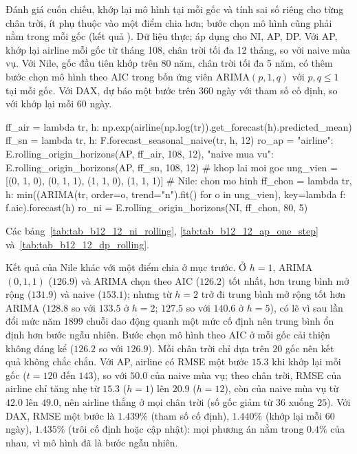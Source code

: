  Đánh giá cuốn chiếu, khớp lại mô hình tại mỗi gốc và tính sai số riêng cho từng chân trời, ít phụ thuộc vào một điểm chia hơn; bước chọn mô hình cũng phải nằm trong mỗi gốc (kết quả ).
 Dữ liệu thực; áp dụng cho NI, AP, DP. Với AP, khớp lại airline mỗi gốc từ tháng 108, chân trời tối đa 12 tháng, so với naive mùa vụ. Với Nile, gốc đầu tiên khớp trên 80 năm, chân trời tối đa 5 năm, có thêm bước chọn mô hình theo AIC trong bốn ứng viên ARIMA$(p,1,q)$ với $p,q\le1$ tại mỗi gốc. Với DAX, dự báo một bước trên $360$ ngày với tham số cố định, so với khớp lại mỗi $60$ ngày.
\begin{codeblock}
ff_air = lambda tr, h: np.exp(airline(np.log(tr)).get_forecast(h).predicted_mean)
ff_sn = lambda tr, h: F.forecast_seasonal_naive(tr, h, 12)
ro_ap = {"airline": E.rolling_origin_horizons(AP, ff_air, 108, 12),
         "naive mua vu": E.rolling_origin_horizons(AP, ff_sn, 108, 12)}      # khop lai moi goc
ung_vien = [(0, 1, 0), (0, 1, 1), (1, 1, 0), (1, 1, 1)]                      # Nile: chon mo hinh
ff_chon = lambda tr, h: min((ARIMA(tr, order=o, trend="n").fit() for o in ung_vien),
                            key=lambda f: f.aic).forecast(h)
ro_ni = E.rolling_origin_horizons(NI, ff_chon, 80, 5)
\end{codeblock}
 Các bảng~\ref{tab:tab_b12_12_ni_rolling}, \ref{tab:tab_b12_12_ap_one_step} và~\ref{tab:tab_b12_12_dp_rolling}.



 Kết quả của Nile khác với một điểm chia ở mục trước. Ở $h=1$, ARIMA$(0,1,1)$ ($126.9$) và ARIMA chọn theo AIC ($126.2$) tốt nhất, hơn trung bình mở rộng ($131.9$) và naive ($153.1$); nhưng từ $h=2$ trở đi trung bình mở rộng tốt hơn ARIMA ($128.8$ so với $133.5$ ở $h=2$; $127.5$ so với $140.6$ ở $h=5$), có lẽ vì sau lần đổi mức năm 1899 chuỗi dao động quanh một mức cố định nên trung bình ổn định hơn bước ngẫu nhiên. Bước chọn mô hình theo AIC ở mỗi gốc cải thiện không đáng kể ($126.2$ so với $126.9$). Mỗi chân trời chỉ dựa trên $20$ gốc nên kết quả không chắc chắn. Với AP, airline có RMSE một bước $15.3$ khi khớp lại mỗi gốc ($t=120$ đến $143$), so với $50.0$ của naive mùa vụ; theo chân trời, RMSE của airline chỉ tăng nhẹ từ $15.3$ ($h=1$) lên $20.9$ ($h=12$), còn của naive mùa vụ từ $42.0$ lên $49.0$, nên airline thắng ở mọi chân trời (số gốc giảm từ $36$ xuống $25$). Với DAX, RMSE một bước là $1.439\%$ (tham số cố định), $1.440\%$ (khớp lại mỗi $60$ ngày), $1.435\%$ (trôi cố định hoặc cập nhật): mọi phương án nằm trong $0.4\%$ của nhau, vì mô hình đã là bước ngẫu nhiên.

